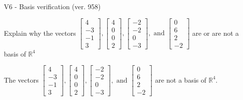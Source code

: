 \begin{exercise}
  \begin{exerciseTitle}V6 - Basis verification (ver. 958)\end{exerciseTitle}
  \begin{exerciseStatement}
    Explain why the vectors \(\left[\begin{array}{r}
4 \\
-3 \\
-1 \\
3
\end{array}\right] , \left[\begin{array}{r}
4 \\
0 \\
0 \\
2
\end{array}\right] , \left[\begin{array}{r}
-2 \\
-2 \\
0 \\
-3
\end{array}\right] , \text{ and } \left[\begin{array}{r}
0 \\
6 \\
2 \\
-2
\end{array}\right]\) are or are not a basis of \(\mathbb{R}^4\)	


  \end{exerciseStatement}
  \begin{exerciseAnswer}
   The vectors \(\left[\begin{array}{r}
4 \\
-3 \\
-1 \\
3
\end{array}\right] , \left[\begin{array}{r}
4 \\
0 \\
0 \\
2
\end{array}\right] , \left[\begin{array}{r}
-2 \\
-2 \\
0 \\
-3
\end{array}\right] , \text{ and } \left[\begin{array}{r}
0 \\
6 \\
2 \\
-2
\end{array}\right]\) 
  	 are not  a basis of \(\mathbb{R}^4\).
  


  \end{exerciseAnswer}
\end{exercise}